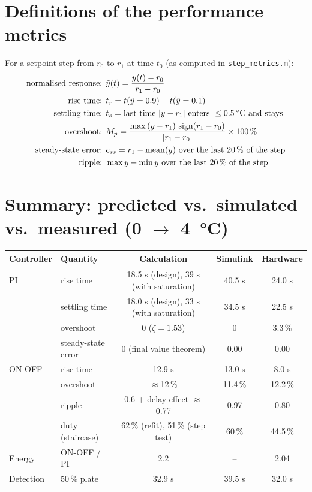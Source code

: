 \documentclass[11pt,a4paper]{article}
\begin{document}
\section{Definitions of the performance metrics}
For a setpoint step from $r_0$ to $r_1$ at time $t_0$ (as computed in \texttt{step\_metrics.m}):
\begin{align*}
\text{normalised response: } & \tilde y(t) = \frac{y(t) - r_0}{r_1 - r_0}\\
\text{rise time: } & t_r = t(\tilde y = 0.9) - t(\tilde y = 0.1)\\
\text{settling time: } & t_s = \text{last time } |y - r_1| \text{ enters } \le \SI{0.5}{\celsius}\text{ and stays}\\
\text{overshoot: } & M_p = \frac{\max\,(y - r_1)\,\operatorname{sign}(r_1 - r_0)}{|r_1 - r_0|}\times100\,\%\\
\text{steady-state error: } & e_{ss} = r_1 - \operatorname{mean}(y) \text{ over the last 20\,\% of the step}\\
\text{ripple: } & \max y - \min y \text{ over the last 20\,\% of the step}
\end{align*}

\section{Summary: predicted vs.\ simulated vs.\ measured (0 $\to$ \SI{+4}{\celsius})}
\begin{center}
\begin{tabular}{@{}llccc@{}}
\toprule
Controller & Quantity & Calculation & Simulink & Hardware\\
\midrule
PI & rise time & 18.5 s (design), 39 s (with saturation) & 40.5 s & 24.0 s\\
   & settling time & 18.0 s (design), 33 s (with saturation) & 34.5 s & 22.5 s\\
   & overshoot & 0 ($\zeta = 1.53$) & 0 & 3.3\,\%\\
   & steady-state error & 0 (final value theorem) & 0.00 & 0.00\\
\midrule
ON-OFF & rise time & 12.9 s & 13.0 s & 8.0 s\\
   & overshoot & $\approx$12\,\% & 11.4\,\% & 12.2\,\%\\
   & ripple & 0.6 + delay effect $\approx$ 0.77 & 0.97 & 0.80\\
   & duty (staircase) & 62\,\% (refit), 51\,\% (step test) & 60\,\% & 44.5\,\%\\
\midrule
Energy & ON-OFF / PI & 2.2 & -- & 2.04\\
Detection & 50\,\% plate & 32.9 s & 39.5 s & 32.0 s\\
\bottomrule
\end{tabular}
\end{center}
\end{document}
